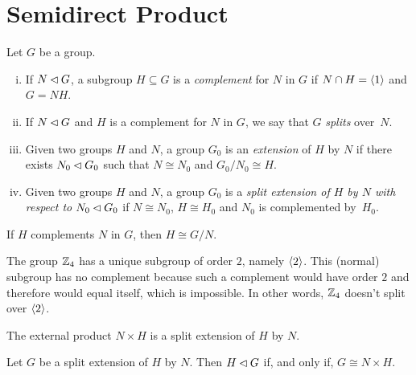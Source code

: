 \section{Semidirect Product}

\begin{defns} Let\/ $G$ be a group.
    \begin{enumerate}[i),font=\upshape]
        \item If\/ $N\lhd G$, a subgroup\/ $H\subseteq G$ is a \textsl{complement} for\/ $N$ in\/ $G$ if\/ $N\cap H=\langle1\rangle$ and\/ $G=NH$.

        \item If\/ $N\lhd G$ and\/ $H$ is a complement for\/ $N$ in\/ $G$, we say that\/ $G$ \textsl{splits} over\/~$N$.

        \item Given two groups\/ $H$ and\/ $N$, a group\/ $G_0$ is an \textsl{extension} of\/ $H$ by\/ $N$ if there exists\/ $N_0\lhd G_0$ such that\/ $N\cong N_0$ and $G_0/N_0\cong H$.

        \item Given two groups\/ $H$ and\/ $N$, a group\/ $G_0$ is a \textsl{split extension of\/ $H$ by\/ $N$ with respect to $N_0\lhd G_0$} if\/ $N\cong N_0$, $H\cong H_0$ and\/ $N_0$ is complemented by\/~$H_0$.
    \end{enumerate}
\end{defns}

\begin{rem}
    If\/ $H$ complements\/ $N$ in\/ $G$, then $H\cong G/N$.
\end{rem}

\begin{xmpl}
    The group $\mathbb{Z}_4$ has a unique subgroup of order\/ $2$, namely $\langle2\rangle$. This (normal) subgroup has no complement because such a complement would have order\/ $2$ and therefore would equal itself, which is impossible. In other words, $\mathbb{Z}_4$ doesn't split over $\langle2\rangle$.
\end{xmpl}

\begin{rem}
    The external product\/ $N\times H$ is a split extension of\/ $H$ by\/ $N$.
\end{rem}

\begin{prop}\label{normal-complement}
    Let\/ $G$ be a split extension of\/ $H$ by\/ $N$. Then $H\lhd G$ if, and only if, $G\cong N\times H$.
\end{prop}

